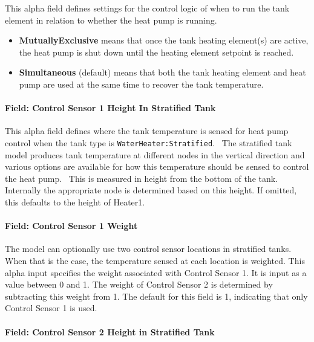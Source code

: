 This alpha field defines settings for the control logic of when to run the tank element in relation to whether the heat pump is running.

\begin{itemize}
\tightlist
\item
  \textbf{MutuallyExclusive} means that once the tank heating element(s) are active, the heat pump is shut down until the heating element setpoint is reached.
\item
  \textbf{Simultaneous} (default) means that both the tank heating element and heat pump are used at the same time to recover the tank temperature.
\end{itemize}

\paragraph{Field: Control Sensor 1 Height In Stratified Tank}\label{field-control-sensor-1-height-in-stratified-tank}

This alpha field defines where the tank temperature is sensed for heat pump control when the tank type is \lstinline!WaterHeater:Stratified!.~ The stratified tank model produces tank temperature at different nodes in the vertical direction and various options are available for how this temperature should be sensed to control the heat pump.~ This is measured in height from the bottom of the tank. Internally the appropriate node is determined based on this height. If omitted, this defaults to the height of Heater1.

\paragraph{Field: Control Sensor 1 Weight}\label{field-control-sensor-1-weight}

The model can optionally use two control sensor locations in stratified tanks. When that is the case, the temperature sensed at each location is weighted. This alpha input specifies the weight associated with Control Sensor 1. It is input as a value between 0 and 1. The weight of Control Sensor 2 is determined by subtracting this weight from 1. The default for this field is 1, indicating that only Control Sensor 1 is used.

\paragraph{Field: Control Sensor 2 Height in Stratified Tank}\label{field-control-sensor-2-height-in-stratified-tank}

